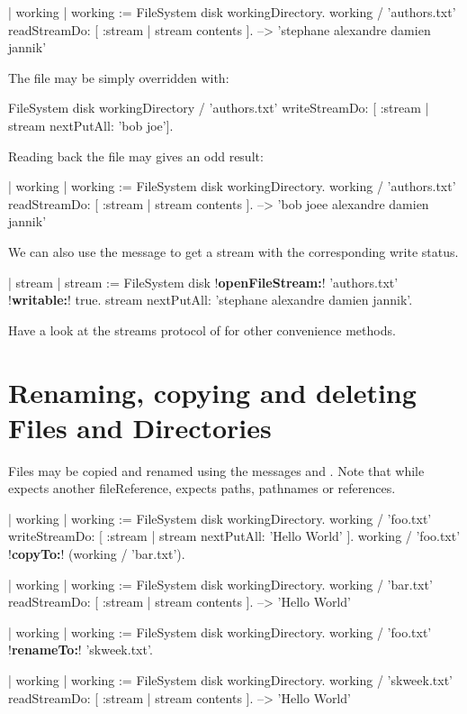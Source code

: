 \documentclass[a4paper,10pt,twoside]{book}
\begin{document}
\begin{code}{}
| working |
working := FileSystem disk workingDirectory.
working / 'authors.txt' readStreamDo: [ :stream | stream contents ]. 
   --> 'stephane alexandre damien jannik'
\end{code}

The file  may be simply overridden with:
\begin{code}{}
FileSystem disk workingDirectory / 'authors.txt' 
	writeStreamDo: [ :stream | stream nextPutAll: 'bob joe'].
\end{code}

Reading back the file may gives an odd result:
\begin{code}{}
| working |
working := FileSystem disk workingDirectory.
working / 'authors.txt' readStreamDo: [ :stream | stream contents ]. 
	-->  'bob joee alexandre damien jannik'
\end{code}


We can also use the message  to get a stream with the corresponding
write status.

\begin{code}{}
| stream |
stream := FileSystem disk !\textbf{openFileStream:}! 'authors.txt' !\textbf{writable:}! true.
stream nextPutAll: 'stephane alexandre damien jannik'.
\end{code}	

Have a look at the streams protocol of  for other convenience methods.



\section{Renaming, copying and deleting Files and Directories}

Files may be copied and renamed using the messages  and \mbox{.} Note that while  expects another fileReference,   expects paths, pathnames or references.

\begin{code}{}
| working |
working := FileSystem disk workingDirectory.
working / 'foo.txt' writeStreamDo: [ :stream | stream nextPutAll: 'Hello World' ].
working / 'foo.txt' !\textbf{copyTo:}! (working / 'bar.txt').

| working  |
working := FileSystem disk workingDirectory.
working / 'bar.txt' readStreamDo: [ :stream | stream contents ].
-->  'Hello World'

| working |
working := FileSystem disk workingDirectory.
working / 'foo.txt' !\textbf{renameTo:}! 'skweek.txt'.

| working  |
working := FileSystem disk workingDirectory.
working / 'skweek.txt' readStreamDo: [ :stream | stream contents ]. 
-->  'Hello World'
\end{code} 
\end{document}
